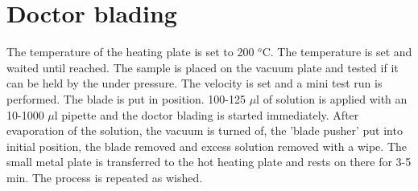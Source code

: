 \documentclass[a4paper]{article}
\begin{document}
\section{Doctor blading}
The temperature of the heating plate is set to 200 $^o$C.
The temperature is set and waited until reached.
The sample is placed on the vacuum plate and tested if it can be held by the under pressure.
The velocity is set and a mini test run is performed. 
The blade is put in position. 
100-125 $\mu$l of solution is applied with an 10-1000 $\mu$l pipette and the doctor blading is started immediately. 
After evaporation of the solution, the vacuum is turned of, the 'blade pusher' put into initial position, the blade removed and excess solution removed with a wipe. 
The small metal plate is transferred to the hot heating plate and rests on there for 3-5 min. 
The process is repeated as wished. 



\clearpage
\end{document}

